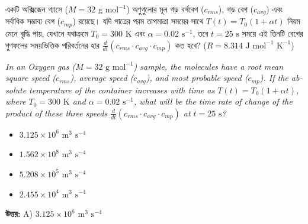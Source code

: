 \documentclass[12pt, a4paper]{article}
\begin{document}
\vspace{2em}

\begin{tcolorbox}[questionbox={প্রশ্ন (Question) 18}]
    \noindent
    একটি অক্সিজেন গ্যাসে ($M = 32\text{ g mol}^{-1}$) অণুগুলোর মূল গড় বর্গবেগ ($c_{rms}$), গড় বেগ ($c_{avg}$) এবং সর্বাধিক সম্ভাব্য বেগ ($c_{mp}$) রয়েছে। যদি পাত্রের পরম তাপমাত্রা সময়ের সাথে $T(t) = T_0 (1 + \alpha t)$ নিয়ম মেনে বৃদ্ধি পায়, যেখানে যথাক্রমে $T_0 = 300\text{ K}$ এবং $\alpha = 0.02\text{ s}^{-1}$, তবে $t = 25\text{ s}$ সময়ে এই তিনটি বেগের গুণফলের সময়ভিত্তিক পরিবর্তনের হার $\frac{d}{dt} (c_{rms} \cdot c_{avg} \cdot c_{mp})$ কত হবে? ($R = 8.314\text{ J mol}^{-1}\text{ K}^{-1}$)
    
    \vspace{0.8em}
    \begin{english}
    \noindent\textit{\color{darkgray}
    In an Oxygen gas ($M = 32\text{ g mol}^{-1}$) sample, the molecules have a root mean square speed ($c_{rms}$), average speed ($c_{avg}$), and most probable speed ($c_{mp}$). If the absolute temperature of the container increases with time as $T(t) = T_0 (1 + \alpha t)$, where $T_0 = 300\text{ K}$ and $\alpha = 0.02\text{ s}^{-1}$, what will be the time rate of change of the product of these three speeds $\frac{d}{dt} (c_{rms} \cdot c_{avg} \cdot c_{mp})$ at $t = 25\text{ s}$?
    }
    \end{english}
\end{tcolorbox}

\begin{itemize}[label={}, leftmargin=1cm, itemsep=0.5em]
    \item[\textbf{A)}] $3.125 \times 10^6\text{ m}^3\text{ s}^{-4}$
    \item[\textbf{B)}] $1.562 \times 10^8\text{ m}^3\text{ s}^{-4}$
    \item[\textbf{C)}] $5.208 \times 10^5\text{ m}^3\text{ s}^{-4}$
    \item[\textbf{D)}] $2.455 \times 10^4\text{ m}^3\text{ s}^{-4}$
\end{itemize}

\vspace{0.5em}
\begin{tcolorbox}[answerbox]
    \textbf{\color{success} উত্তর:} A) $3.125 \times 10^6\text{ m}^3\text{ s}^{-4}$
\end{tcolorbox}
\vspace{1em}
\end{document}
